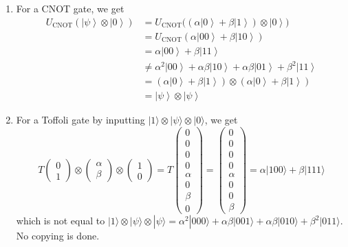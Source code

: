 \documentclass{article}
\newcommand{\ket}[1]{\ensuremath{\left|#1\right\rangle}}
\begin{document}
    \begin{enumerate}
      \item For a CNOT gate, we get 
      \begin{align} 
        U_{\mathrm{CNOT}} (\ket{\psi} \otimes \ket{0}) 
        & = U_{\mathrm{CNOT}} \big( (\alpha \ket{0} + \beta \ket{1}) \otimes \ket{0} \big) \\
        & = U_{\mathrm{CNOT}} (\alpha \ket{00} + \beta \ket{10}) \\
        & = \alpha \ket{00} + \beta \ket{11} \\
        & \neq \alpha^2 \ket{00} + \alpha \beta \ket{10} + \alpha \beta \ket{01} + \beta^2 \ket{11} \\ 
        & = (\alpha \ket{0} + \beta \ket{1}) \otimes (\alpha \ket{0} + \beta \ket{1}) \\ 
        & = \ket{\psi} \otimes \ket{\psi}
      \end{align}

      \item For a Toffoli gate by inputting $|1\rangle \otimes |\psi \rangle \otimes |0\rangle$, we get
        \begin{equation} 
          T \begin{pmatrix} 0 \\ 1 \end{pmatrix} \otimes \begin{pmatrix} \alpha \\ \beta \end{pmatrix} \otimes \begin{pmatrix} 1 \\ 0 \end{pmatrix} = T \begin{pmatrix} 0\\0\\0\\0\\ \alpha \\ 0 \\ \beta \\ 0 \end{pmatrix} = \begin{pmatrix} 0\\0\\0\\0\\ \alpha \\ 0 \\ 0 \\ \beta \end{pmatrix} = \alpha |100\rangle + \beta |111\rangle
        \end{equation}
      which is not equal to $|1\rangle \otimes |\psi \rangle \otimes |\psi\rangle = \alpha^2 |000\rangle + \alpha \beta |001 \rangle + \alpha \beta |010\rangle + \beta^2 |011\rangle$. No copying is done.
    \end{enumerate}
\end{document}
